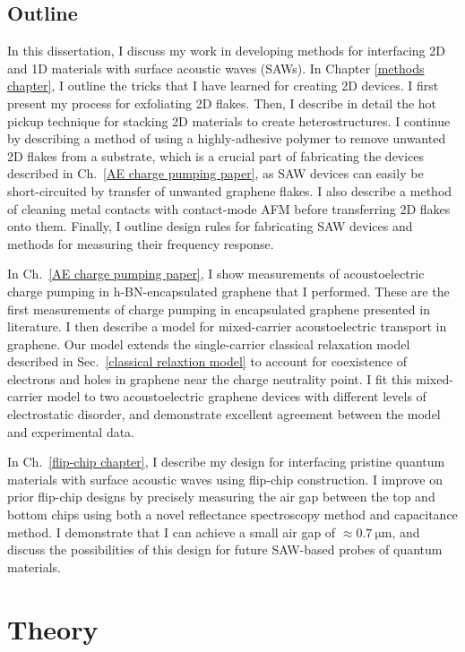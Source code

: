 \documentclass[double,12pt,1in,seploa]{beavtex}
\let\Oldsection\section
\renewcommand{\section}{\FloatBarrier\Oldsection}
\begin{document}
\section{Outline}
In this dissertation, I discuss my work in developing methods for interfacing 2D and 1D materials with surface acoustic waves (SAWs). In Chapter \ref{methods chapter}, I outline the tricks that I have learned for creating 2D devices. I first present my process for exfoliating 2D flakes. Then, I describe in detail the hot pickup technique for stacking 2D materials to create heterostructures. I continue by describing a method of using a highly-adhesive polymer to remove unwanted 2D flakes from a substrate, which is a crucial part of fabricating the devices described in Ch.\ \ref{AE charge pumping paper}, as SAW devices can easily be short-circuited by transfer of unwanted graphene flakes. I also describe a method of cleaning metal contacts with contact-mode AFM before transferring 2D flakes onto them. Finally, I outline design rules for fabricating SAW devices and methods for measuring their frequency response. 

In Ch.\ \ref{AE charge pumping paper}, I show measurements of acoustoelectric charge pumping in h-BN-encapsulated graphene that I performed. These are the first measurements of charge pumping in encapsulated graphene presented in literature. I then describe a model for mixed-carrier acoustoelectric transport in graphene. Our model extends the single-carrier classical relaxation model described in Sec.\ \ref{classical relaxtion model} to account for coexistence of electrons and holes in graphene near the charge neutrality point. I fit this mixed-carrier model to two acoustoelectric graphene devices with different levels of electrostatic disorder, and demonstrate excellent agreement between the model and experimental data.

In Ch.\ \ref{flip-chip chapter}, I describe my design for interfacing pristine quantum materials with surface acoustic waves using flip-chip construction. I improve on prior flip-chip designs by precisely measuring the air gap between the top and bottom chips using both a novel reflectance spectroscopy method and capacitance method. I demonstrate that I can achieve a small air gap of $\approx \SI{0.7}{\micro\meter}$, and discuss the possibilities of this design for future SAW-based probes of quantum materials.


\chapter{Theory}
\end{document}
